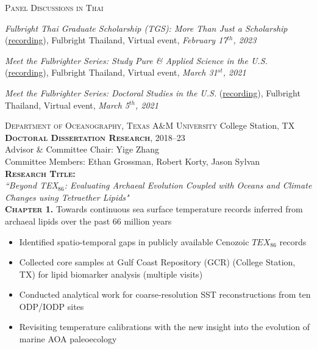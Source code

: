 \documentclass[10pt]{article}
\newcommand{\margintext}[1]{\marginnote{\normalsize\textbf #1 |}}
\begin{document}
\textsc{Panel Discussions in Thai}
\begin{etaremune}
\item \textit{Fulbright Thai Graduate Scholarship (TGS): More Than Just a Scholarship} (\href{https://fb.watch/iLwkVkeNjJ/}{recording}), Fulbright Thailand, Virtual event, \textit{February 17$^{th}$, 2023}
\item \textit{Meet the Fulbrighter Series: Study Pure \& Applied Science in the U.S.} (\href{https://www.facebook.com/watch/?v=192470062421053}{recording}), Fulbright Thailand, Virtual event, \textit{March 31$^{st}$, 2021}
\item \textit{Meet the Fulbrighter Series: Doctoral Studies in the U.S.} (\href{https://www.facebook.com/watch/?v=1018096972055863}{recording}), Fulbright Thailand, Virtual event,\textit{ March 5$^{th}$, 2021} 
\end{etaremune}

\bigskip
\margintext{Previous Research Experience}
\textsc{Department of Oceanography, Texas A\&M University} \hfill College Station, TX \\
\textsc{\textbf{Doctoral Dissertation Research}}, 2018–23 \\
Advisor \& Committee Chair: Yige Zhang \\ 
Committee Members: Ethan Grossman, Robert Korty, Jason Sylvan \\

\textbf{\textsc{Research Title:}} \\
\textit{``Beyond TEX$_{86}$: Evaluating Archaeal Evolution Coupled with Oceans and Climate Changes using Tetraether Lipids"} \\

\textbf{\textsc{Chapter 1.}} Towards continuous sea surface temperature records inferred from archaeal lipids over the past 66 million years
\begin{itemize}[leftmargin=*]
    \item Identified spatio-temporal gaps in publicly available Cenozoic $TEX_{86}$ records
    \item Collected core samples at Gulf Coast Repository (GCR) (College Station, TX) for lipid biomarker analysis (multiple visits)
    \item Conducted analytical work for coarse-resolution SST reconstructions from ten ODP/IODP sites
    \item Revisiting temperature calibrations with the new insight into the evolution of marine AOA paleoecology
\end{itemize}   
\end{document}

